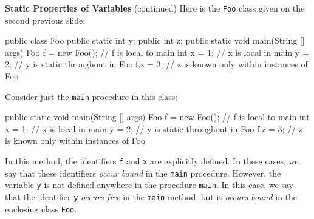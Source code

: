 \begin{minipage}[t]{\sw}
\slidenumber
\LARGE
{\bf Static Properties of Variables} (continued)\exx
\Large
Here is the \verb'Foo' class given on the second previous slide:
\large
\begin{qv}
public class Foo {
   public static int y;
   public int z;
   public static void main(String [] args) {
     Foo f = new Foo(); // f is local to main
     int x = 1; // x is local in main
     y = 2; // y is static throughout in Foo
     f.z = 3; // z is known only within instances of Foo
   }
}
\end{qv}
\Large
Consider just the \verb'main' procedure in this class:
\large
\begin{qv}
   public static void main(String [] args) {
     Foo f = new Foo(); // f is local to main
     int x = 1; // x is local in main
     y = 2; // y is static throughout in Foo
     f.z = 3; // z is known only within instances of Foo
   }
\end{qv}
\Large
In this method, the identifiers
\verb'f' and \verb'x' are explicitly defined.
In these cases, we say that these identifiers {\em occur bound}
in the \verb'main' procedure.\exx
However, the variable \verb'y' is not defined anywhere
in the procedure \verb'main'.
In this case, we say that the identifier \verb'y' {\em occurs free}
in the \verb'main' method,
but it {\em occurs bound} in the enclosing class \verb'Foo'.
\end{minipage}
\clearpage
